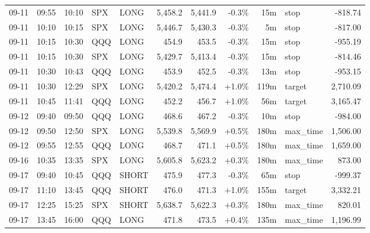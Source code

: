 \documentclass[11pt,a4paper,twoside]{article}
\begin{document}
\begin{center}
\begin{longtable}{>{\color{txtmain}}l l l l l r r r r >{\color{txtmain}}l r}
09-11 & 09:55 & 10:10 & SPX & LONG & 5,458.2 & 5,441.9 & \textcolor{lossred}{-0.3\%} & 15m & stop & \textcolor{lossred}{-818.74} \\
09-11 & 10:10 & 10:15 & SPX & LONG & 5,446.7 & 5,430.3 & \textcolor{lossred}{-0.3\%} & 5m & stop & \textcolor{lossred}{-817.00} \\
09-11 & 10:15 & 10:30 & QQQ & LONG & 454.9 & 453.5 & \textcolor{lossred}{-0.3\%} & 15m & stop & \textcolor{lossred}{-955.19} \\
09-11 & 10:15 & 10:30 & SPX & LONG & 5,429.7 & 5,413.4 & \textcolor{lossred}{-0.3\%} & 15m & stop & \textcolor{lossred}{-814.46} \\
09-11 & 10:30 & 10:43 & QQQ & LONG & 453.9 & 452.5 & \textcolor{lossred}{-0.3\%} & 13m & stop & \textcolor{lossred}{-953.15} \\
09-11 & 10:30 & 12:29 & SPX & LONG & 5,420.2 & 5,474.4 & \textcolor{wingreen}{+1.0\%} & 119m & target & \textcolor{wingreen}{2,710.09} \\
09-11 & 10:45 & 11:41 & QQQ & LONG & 452.2 & 456.7 & \textcolor{wingreen}{+1.0\%} & 56m & target & \textcolor{wingreen}{3,165.47} \\
09-12 & 09:40 & 09:50 & QQQ & LONG & 468.6 & 467.2 & \textcolor{lossred}{-0.3\%} & 10m & stop & \textcolor{lossred}{-984.00} \\
09-12 & 09:50 & 12:50 & SPX & LONG & 5,539.8 & 5,569.9 & \textcolor{wingreen}{+0.5\%} & 180m & max\_time & \textcolor{wingreen}{1,506.00} \\
09-12 & 09:55 & 12:55 & QQQ & LONG & 468.7 & 471.1 & \textcolor{wingreen}{+0.5\%} & 180m & max\_time & \textcolor{wingreen}{1,659.00} \\
09-16 & 10:35 & 13:35 & SPX & LONG & 5,605.8 & 5,623.2 & \textcolor{wingreen}{+0.3\%} & 180m & max\_time & \textcolor{wingreen}{873.00} \\
09-17 & 09:40 & 10:45 & QQQ & SHORT & 475.9 & 477.3 & \textcolor{lossred}{-0.3\%} & 65m & stop & \textcolor{lossred}{-999.37} \\
09-17 & 11:10 & 13:45 & QQQ & SHORT & 476.0 & 471.3 & \textcolor{wingreen}{+1.0\%} & 155m & target & \textcolor{wingreen}{3,332.21} \\
09-17 & 12:25 & 15:25 & SPX & SHORT & 5,638.7 & 5,622.3 & \textcolor{wingreen}{+0.3\%} & 180m & max\_time & \textcolor{wingreen}{820.01} \\
09-17 & 13:45 & 16:00 & QQQ & LONG & 471.8 & 473.5 & \textcolor{wingreen}{+0.4\%} & 135m & max\_time & \textcolor{wingreen}{1,196.99} \\

\end{longtable}
\end{center}
\end{document}
